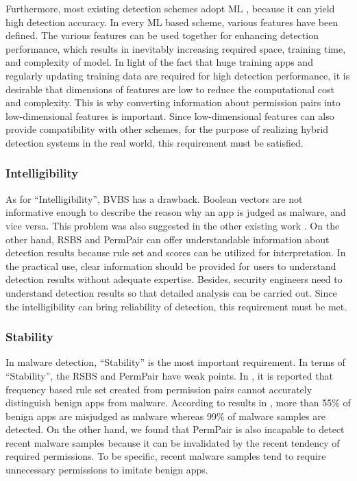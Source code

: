 \documentclass{ieeeaccess}
\begin{document}
Furthermore, most existing detection schemes adopt ML \cite{wang2018detecting, garg2017network, aafer2013droidapiminer, xu2016iccdetector, cai2018droidcat, sanz2013puma, li2018significant, liu2014two}, because it can yield high detection accuracy.
In every ML based scheme, various features have been defined.
The various features can be used together for enhancing detection performance, which results in inevitably increasing required space, training time, and complexity of model.
In light of the fact that huge training apps and regularly updating training data are required for high detection performance, it is desirable that dimensions of features are low to reduce the computational cost and complexity.
This is why converting information about permission pairs into low-dimensional features is important.
Since low-dimensional features can also provide compatibility with other schemes, for the purpose of realizing hybrid detection systems in the real world, this requirement must be satisfied.

\subsubsection{Intelligibility}
As for ``Intelligibility'', BVBS \cite{liu2014two} has a drawback.
Boolean vectors are not informative enough to describe the reason why an app is judged as malware, and vice versa.
This problem was also suggested in the other existing work \cite{wang2014exploring}.
On the other hand, RSBS \cite{liang2014permission} and PermPair \cite{arora2019permpair} can offer understandable information about detection results because rule set and scores can be utilized for interpretation.
In the practical use, clear information should be provided for users to understand detection results without adequate expertise.
Besides, security engineers need to understand detection results so that detailed analysis can be carried out.
Since the intelligibility can bring reliability of detection, this requirement must be met.

\subsubsection{Stability}
In malware detection, ``Stability'' is the most important requirement.
In terms of ``Stability'', the RSBS \cite{liang2014permission} and PermPair \cite{arora2019permpair} have weak points.
In \cite{liang2014permission}, it is reported that frequency based rule set created from permission pairs cannot accurately distinguish benign apps from malware.
According to results in \cite{liang2014permission}, more than 55\% of benign apps are misjudged as malware whereas 99\% of malware samples are detected.
On the other hand, we found that PermPair \cite{arora2019permpair} is also incapable to detect recent malware samples because it can be invalidated by the recent tendency of required permissions.
To be specific, recent malware samples tend to require unnecessary permissions to imitate benign apps.
\end{document}
